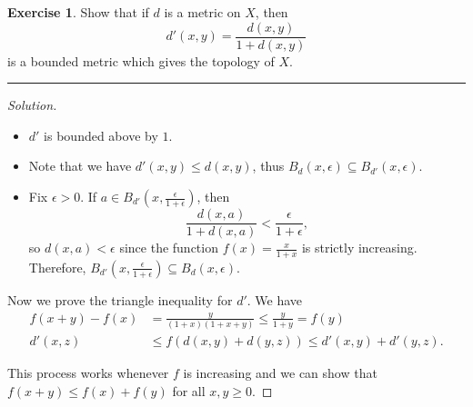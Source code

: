 \documentclass{article}
\theoremstyle{definition}
\newtheorem{exercise}{Exercise}[section]
\begin{document}
\pagebreak

\begin{exercise}
  Show that if $d$ is a metric on $X$, then
  $$d'(x,y) = \frac{d(x,y)}{1+d(x,y)}$$
  is a bounded metric which gives the topology of $X$.
\end{exercise}
\hrule
\begin{proof}[Solution]
  \begin{itemize}
    \item $d'$ is bounded above by $1$.
    \item Note that we have $d'(x,y) \le d(x,y)$, thus $B_d(x,\epsilon)\subseteq B_{d'}(x,\epsilon)$.
    \item Fix $\epsilon > 0$. If $a\in B_{d'}(x,\frac{\epsilon}{1+\epsilon})$, then
      $$\frac{d(x,a)}{1+d(x,a)} < \frac{\epsilon}{1+\epsilon},$$
      so $d(x,a) < \epsilon$ since the function $f(x) = \frac{x}{1+x}$ is strictly increasing. Therefore, $B_{d'}(x,\frac{\epsilon}{1+\epsilon})\subseteq B_d(x,\epsilon)$.
  \end{itemize}
  Now we prove the triangle inequality for $d'$. We have
  \begin{align*}
    f(x+y) - f(x) &= \frac{y}{(1+x)(1+x+y)}\le \frac{y}{1+y} = f(y) \\
    d'(x,z) &\le f(d(x,y) + d(y,z)) \le d'(x,y) + d'(y,z).
  \end{align*}

  This process works whenever $f$ is increasing and we can show that $f(x+y)\le f(x) + f(y)$ for all $x,y\ge 0$.
\end{proof}

\pagebreak
\end{document}
